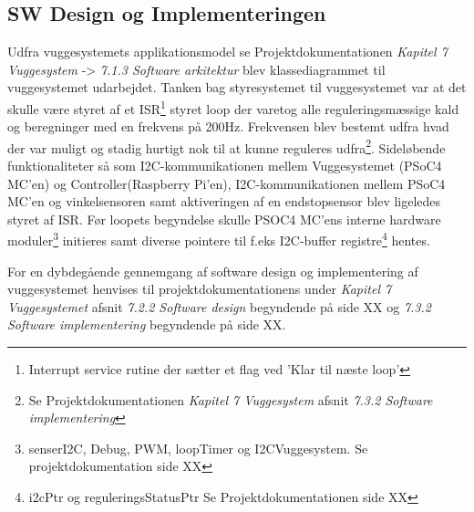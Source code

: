 \subsection*{SW Design og Implementeringen}
\label{vs_sw}
Udfra vuggesystemets applikationsmodel se Projektdokumentationen \textit{Kapitel 7 Vuggesystem} -> \textit{7.1.3 Software arkitektur} blev klassediagrammet til vuggesystemet udarbejdet.
Tanken bag styresystemet til vuggesystemet var at det skulle være styret af et ISR\footnote{Interrupt service rutine der sætter et flag ved 'Klar til næste loop'} styret loop der varetog alle reguleringsmæssige kald og beregninger med en frekvens på 200Hz. Frekvensen blev bestemt udfra hvad der var muligt og stadig hurtigt nok til at kunne reguleres udfra\footnote{Se Projektdokumentationen \textit{Kapitel 7 Vuggesystem} afsnit \textit{7.3.2 Software implementering}}. Sideløbende funktionaliteter så som I2C-kommunikationen mellem Vuggesystemet (PSoC4 MC'en) og Controller(Raspberry Pi'en), I2C-kommunikationen mellem PSoC4 MC'en og vinkelsensoren samt aktiveringen af en endstopsensor blev ligeledes styret af ISR. Før loopets begyndelse skulle PSOC4 MC'ens interne hardware moduler\footnote{senserI2C, Debug, PWM, loopTimer og I2CVuggesystem. Se projektdokumentation side XX} initieres samt diverse pointere til f.eks I2C-buffer registre\footnote{i2cPtr og reguleringsStatusPtr Se Projektdokumentationen side XX} hentes.

For en dybdegående gennemgang af software design og implementering af vuggesystemet henvises til projektdokumentationens under \textit{Kapitel 7 Vuggesystemet} afsnit \textit{7.2.2 Software design} begyndende på side XX og \textit{7.3.2 Software implementering} begyndende på side XX.
